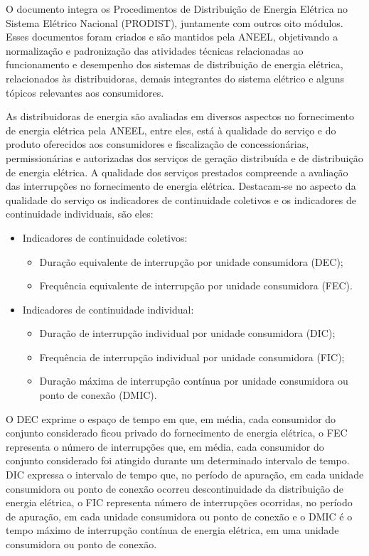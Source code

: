\par 
O documento \cite{MOD08} integra os Procedimentos de Distribuição de Energia Elétrica no Sistema Elétrico Nacional (PRODIST), juntamente com outros oito módulos. Esses documentos foram criados e são mantidos pela ANEEL, objetivando a normalização e padronização das atividades técnicas relacionadas ao funcionamento e desempenho dos sistemas de distribuição de energia elétrica, relacionados às distribuidoras, demais integrantes do sistema elétrico e alguns tópicos relevantes aos consumidores.
\par
As distribuidoras de energia são avaliadas em diversos aspectos no fornecimento de energia elétrica pela ANEEL, entre eles, está à qualidade do serviço e do produto oferecidos aos consumidores e fiscalização de concessionárias, permissionárias e autorizadas dos serviços de geração distribuída e de distribuição de energia elétrica. A qualidade dos serviços prestados compreende a avaliação das interrupções no fornecimento de energia elétrica. Destacam-se no aspecto da qualidade do serviço os indicadores de continuidade coletivos e os indicadores de continuidade individuais, são eles:
\begin{itemize}
\item Indicadores de continuidade coletivos:
	\begin{itemize}
		\item Duração equivalente de interrupção por unidade consumidora (DEC); 
		\item Frequência equivalente de interrupção por unidade consumidora (FEC).	
	\end{itemize}
\item Indicadores de continuidade individual:
	\begin{itemize}
		\item Duração de interrupção individual por unidade consumidora (DIC);
		\item Frequência de interrupção individual por unidade consumidora (FIC);
		\item Duração máxima de interrupção contínua por unidade consumidora ou ponto de conexão (DMIC).
	\end{itemize}
\end{itemize}
\par
O DEC exprime o espaço de tempo em que, em média, cada consumidor do conjunto considerado ficou privado do fornecimento de energia elétrica, o FEC representa o número de interrupções que, em média, cada consumidor do conjunto considerado foi atingido durante um determinado intervalo de tempo. DIC expressa o intervalo de tempo que, no período de apuração, em cada unidade consumidora ou ponto de conexão ocorreu descontinuidade da distribuição de energia elétrica, o FIC representa número de interrupções ocorridas, no período de apuração, em cada unidade consumidora ou ponto de conexão e o DMIC é o tempo máximo de interrupção contínua de energia elétrica, em uma unidade consumidora ou ponto de conexão.
